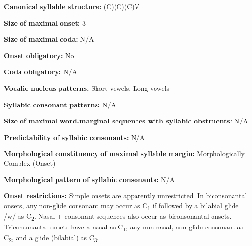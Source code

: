 \begin{styleBody}
\textbf{Canonical} \textbf{syllable} \textbf{structure:} (C)(C)(C)V \citep[20-21]{Kawasha2003}
\end{styleBody}

\begin{styleBody}
\textbf{Size} \textbf{of} \textbf{maximal} \textbf{onset:} 3
\end{styleBody}

\begin{styleBody}
\textbf{Size} \textbf{of} \textbf{maximal} \textbf{coda:} N/A
\end{styleBody}

\begin{styleBody}
\textbf{Onset} \textbf{obligatory:} No
\end{styleBody}

\begin{styleBody}
\textbf{Coda} \textbf{obligatory:} N/A
\end{styleBody}

\begin{styleBody}
\textbf{Vocalic} \textbf{nucleus} \textbf{patterns:} Short vowels, Long vowels
\end{styleBody}

\begin{styleBody}
\textbf{Syllabic} \textbf{consonant} \textbf{patterns:} N/A
\end{styleBody}

\begin{styleBody}
\textbf{Size} \textbf{of} \textbf{maximal} \textbf{word{}-marginal sequences with syllabic obstruents:} N/A
\end{styleBody}

\begin{styleBody}
\textbf{Predictability} \textbf{of} \textbf{syllabic} \textbf{consonants:} N/A
\end{styleBody}

\begin{styleBody}
\textbf{Morphological} \textbf{constituency} \textbf{of} \textbf{maximal} \textbf{syllable} \textbf{margin:} Morphologically Complex (Onset)
\end{styleBody}

\begin{styleBody}
\textbf{Morphological} \textbf{pattern} \textbf{of} \textbf{syllabic} \textbf{consonants:} N/A
\end{styleBody}

\begin{styleBody}
\textbf{Onset} \textbf{restrictions:} Simple onsets are apparently unrestricted. In biconsonantal onsets, any non-glide consonant may occur as C\textsubscript{1} if followed by a bilabial glide /w/ as C\textsubscript{2}. Nasal + consonant sequences also occur as biconsonantal onsets. Triconsonantal onsets have a nasal as C\textsubscript{1}, any non-nasal, non-glide consonant as C\textsubscript{2}, and a glide (bilabial) as C\textsubscript{3}.
\end{styleBody}

